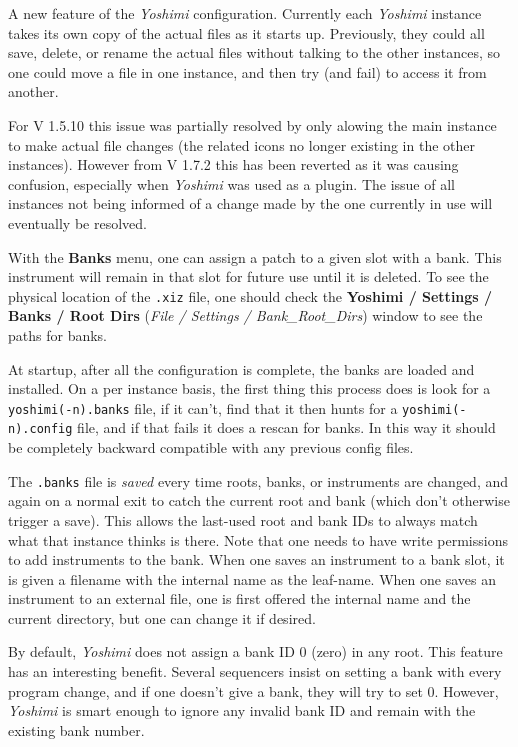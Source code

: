    A new feature of the \textsl{Yoshimi} configuration.  Currently each
   \textsl{Yoshimi} instance takes its own copy of the actual files as it starts
   up.  Previously, they could all save, delete, or rename the actual files without
   talking to the other instances, so one could move a file in one instance, and
   then try (and fail) to access it from another.

   For V 1.5.10 this issue was partially resolved by only alowing the main instance
   to make actual file changes (the related icons no longer existing in the
   other instances). However from V 1.7.2 this has been reverted as it was causing
   confusion, especially when \textsl{Yoshimi} was used as a plugin. The issue of
   all instances not being informed of a change made by the one currently in use
   will eventually be resolved.

   With the \textbf{Banks} menu, one can assign a patch to a given slot with
   a bank.  This instrument will remain in that slot for future use until it is
   deleted. To see the physical location of the \texttt{.xiz} file, one
   should check the
   \textbf{Yoshimi / Settings / Banks / Root Dirs}
   (\textsl{File / Settings / Bank\_Root\_Dirs}) window to see the paths for
   banks.

   At startup, after all the configuration is complete, the banks are loaded and
   installed.  On a per instance basis, the first thing this process does is
   look for a \texttt{yoshimi(-n).banks} file, if it can't, find that it then
   hunts for a \texttt{yoshimi(-n).config} file, and if that fails it does a
   rescan for banks. In this way it should be completely backward compatible
   with any previous config files.

   The \texttt{.banks} file is \textsl{saved} every time roots, banks, or
   instruments are changed, and again on a normal exit to catch the current
   root and bank (which don't otherwise trigger a save).  This allows the
   last-used root and bank IDs to always match what that instance thinks is
   there.  Note that one needs to have write permissions to add instruments to
   the bank.  When one saves an instrument to a bank slot, it is given a
   filename with the internal name as the leaf-name.  When one saves an
   instrument to an external file, one is  first offered the internal name
   and the current directory, but one can change it if desired.

   By default, \textsl{Yoshimi} does not assign a bank ID 0 (zero) in any root.
   This feature has an interesting benefit. Several sequencers insist on
   setting a bank with every program change, and if one doesn't give a bank,
   they will try to set 0. However, \textsl{Yoshimi} is smart enough to ignore
   any invalid bank ID and remain with the existing bank number.

